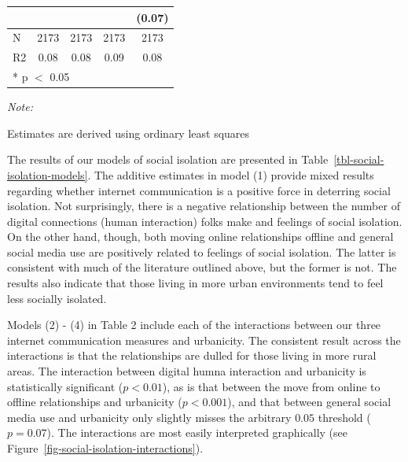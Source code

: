 \documentclass[]{interact}
\theoremstyle{plain}%
\theoremstyle{definition}
\theoremstyle{remark}
\begin{document}
\begin{table}
{\begin{threeparttable}
\begin{tabular}[t]{lcccc}
 &  &  &  & (\num{0.07})\\
\midrule
N & \num{2173} & \num{2173} & \num{2173} & \num{2173}\\
R2 & \num{0.08} & \num{0.08} & \num{0.09} & \num{0.08}\\
\bottomrule
\multicolumn{5}{l}{\rule{0pt}{1em}* p $<$ 0.05}\\
\end{tabular}
\begin{tablenotes}
\item \textit{Note: } 
\item Estimates are derived using ordinary least squares
\end{tablenotes}
\end{threeparttable}

}

\end{table}%

The results of our models of social isolation are presented in
Table~\ref{tbl-social-isolation-models}. The additive estimates in model
(1) provide mixed results regarding whether internet communication is a
positive force in deterring social isolation. Not surprisingly, there is
a negative relationship between the number of digital connections (human
interaction) folks make and feelings of social isolation. On the other
hand, though, both moving online relationships offline and general
social media use are positively related to feelings of social isolation.
The latter is consistent with much of the literature outlined above, but
the former is not. The results also indicate that those living in more
urban environments tend to feel less socially isolated.

Models (2) - (4) in Table 2 include each of the interactions between our
three internet communication measures and urbanicity. The consistent
result across the interactions is that the relationships are dulled for
those living in more rural areas. The interaction between digital humna
interaction and urbanicity is statistically significant (\(p < 0.01\)),
as is that between the move from online to offline relationships and
urbanicity (\(p < 0.001\)), and that between general social media use
and urbanicity only slightly misses the arbitrary \(0.05\) threshold
(\(p = 0.07\)). The interactions are most easily interpreted graphically
(see Figure~\ref{fig-social-isolation-interactions}).
\end{document}
